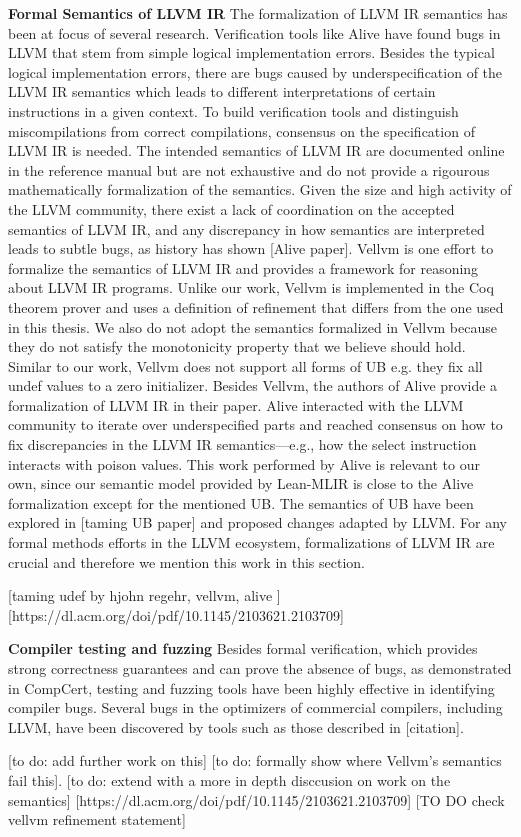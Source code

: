 \textbf{Formal Semantics of LLVM IR}
The formalization of LLVM IR semantics has been at focus of several research. Verification tools like Alive have found bugs in LLVM that stem from simple logical implementation errors. Besides the typical logical implementation errors, there are bugs caused by underspecification of the LLVM IR semantics which leads to different interpretations of certain instructions in a given context. To build verification tools and distinguish miscompilations from correct compilations,  consensus on the specification of LLVM IR is needed. The intended semantics of LLVM IR are documented online in the reference manual but are not exhaustive and do not provide a  rigourous mathematically formalization of the semantics. Given the size and high activity of the LLVM community, there exist a lack of coordination on the accepted semantics of LLVM IR, and any discrepancy in how semantics are interpreted leads to subtle bugs, as history has shown [Alive paper]. Vellvm is one effort to formalize the semantics of LLVM IR and provides a framework for reasoning about LLVM IR programs. Unlike our work, Vellvm is implemented in the Coq theorem prover and uses a definition of refinement that differs from the one used in this thesis.  We also do not adopt the semantics formalized in Vellvm because they do not satisfy the monotonicity property that we believe should hold. Similar to our work, Vellvm does not support all forms of UB e.g. they fix all undef values to a zero initializer. Besides Vellvm, the authors of Alive provide a formalization of LLVM IR in their paper. Alive interacted with the LLVM community to iterate over underspecified parts and reached consensus on how to fix discrepancies in the LLVM IR semantics—e.g., how the select instruction interacts with poison values. This work performed by Alive is relevant to our own, since our semantic model provided by Lean-MLIR is close to the Alive formalization except for the mentioned UB. The semantics of UB have been explored in [taming UB paper] and proposed changes adapted by LLVM.  For any formal methods efforts in the LLVM ecosystem, formalizations of LLVM IR are crucial and therefore we mention this work in this section. 

[taming udef by hjohn regehr, vellvm, alive ]
[https://dl.acm.org/doi/pdf/10.1145/2103621.2103709]


\textbf{Compiler testing and fuzzing}
Besides formal verification, which provides strong correctness guarantees and can prove the absence of bugs, as demonstrated in CompCert, testing and fuzzing tools have been highly effective in identifying compiler bugs. Several bugs in the optimizers of commercial compilers, including LLVM, have been discovered by tools such as those described in [citation].

[to do: add further work on this]
[to do: formally show where Vellvm's semantics fail this].
[to do: extend with a more in depth disccusion on work on the semantics]
[https://dl.acm.org/doi/pdf/10.1145/2103621.2103709]
[TO DO check vellvm refinement statement]


